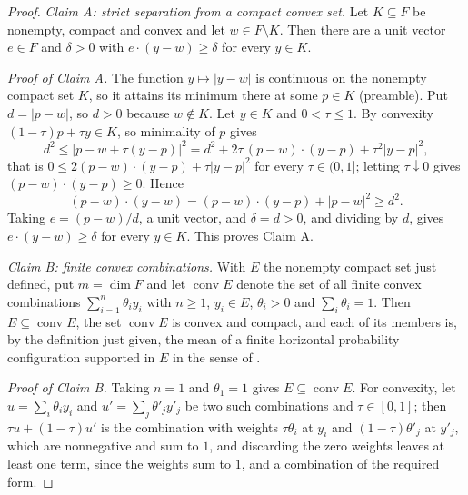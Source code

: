 \begin{proof}
\emph{Claim A: strict separation from a compact convex set.} Let
$K\subseteq F$ be nonempty, compact and convex and let $w\in F\setminus K$.
Then there are a unit vector $e\in F$ and $\delta>0$ with
$e\cdot(y-w)\ge\delta$ for every $y\in K$.

\emph{Proof of Claim A.} The function $y\mapsto|y-w|$ is continuous on the
nonempty compact set $K$, so it attains its minimum there at some $p\in K$
(preamble). Put $d=|p-w|$, so $d>0$ because $w\notin K$. Let $y\in K$ and
$0<\tau\le1$. By convexity $(1-\tau)p+\tau y\in K$, so minimality of $p$ gives
\[
  d^2\le\bigl|p-w+\tau(y-p)\bigr|^2
      =d^2+2\tau\,(p-w)\cdot(y-p)+\tau^2|y-p|^2 ,
\]
that is $0\le2(p-w)\cdot(y-p)+\tau|y-p|^2$ for every $\tau\in(0,1]$; letting
$\tau\downarrow0$ gives $(p-w)\cdot(y-p)\ge0$. Hence
\[
  (p-w)\cdot(y-w)=(p-w)\cdot(y-p)+|p-w|^2\ge d^2 .
\]
Taking $e=(p-w)/d$, a unit vector, and $\delta=d>0$, and dividing by $d$, gives
$e\cdot(y-w)\ge\delta$ for every $y\in K$. This proves Claim A.

\emph{Claim B: finite convex combinations.} With $E$ the nonempty compact set
just defined, put $m=\dim F$ and let $\operatorname{conv}E$ denote the set of all
finite convex combinations $\sum_{i=1}^n\theta_iy_i$ with $n\ge1$, $y_i\in E$,
$\theta_i>0$ and $\sum_i\theta_i=1$. Then $E\subseteq\operatorname{conv}E$, the
set $\operatorname{conv}E$ is convex and compact, and each of its members is, by
the definition just given, the mean of a finite horizontal probability
configuration supported in $E$ in the sense of .

\emph{Proof of Claim B.} Taking $n=1$ and $\theta_1=1$ gives
$E\subseteq\operatorname{conv}E$. For convexity, let $u=\sum_i\theta_iy_i$ and
$u'=\sum_j\theta'_jy'_j$ be two such combinations and $\tau\in[0,1]$; then
$\tau u+(1-\tau)u'$ is the combination with weights $\tau\theta_i$ at $y_i$ and
$(1-\tau)\theta'_j$ at $y'_j$, which are nonnegative and sum to $1$, and
discarding the zero weights leaves at least one term, since the weights sum to
$1$, and a combination of the required form.


\end{proof}

